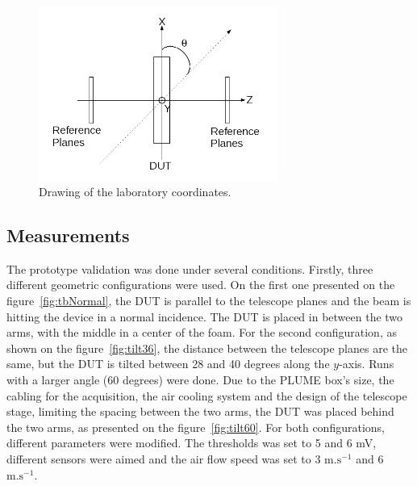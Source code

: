     \begin{figure}
      \centering
      \includegraphics[width = 0.7\textwidth]{Pictures/deformation/lab_frame.png}
      \caption{Drawing of the laboratory coordinates.}
      \label{fig:labCoordinates}
    \end{figure}

    \subsection{Measurements}

    The prototype validation was done under several conditions.
    Firstly, three different geometric configurations were used.
    On the first one presented on the figure~\ref{fig:tbNormal}, the \gls{DUT} is parallel to the telescope planes and the beam is hitting the device in a normal incidence.
    The \gls{DUT} is placed in between the two arms, with the middle in a center of the foam.
    For the second configuration, as shown on the figure~\ref{fig:tilt36}, the distance between the telescope planes are the same, but the \gls{DUT} is tilted between 28 and 40 degrees along the $y$-axis.
    Runs with a larger angle (60 degrees) were done.
    Due to the PLUME box's size, the cabling for the acquisition, the air cooling system and the design of the telescope stage, limiting the spacing between the two arms, the \gls{DUT} was placed behind the two arms, as presented on the figure~\ref{fig:tilt60}.
    For both configurations, different parameters were modified.
    The thresholds was set to 5 and 6 mV, different sensors were aimed and the air flow speed was set to 3 $\text{m.s}^{-1}$ and 6 $\text{m.s}^{-1}$.

